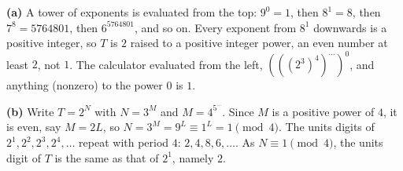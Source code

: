 \textbf{(a)} A tower of exponents is evaluated from the top: $9^0=1$, then $8^1=8$, then $7^8=5764801$, then $6^{5764801}$, and so on. Every exponent from $8^1$ downwards is a positive integer, so $T$ is $2$ raised to a positive integer power, an even number at least $2$, not $1$. The calculator evaluated from the left, $\left(\left(\left(2^3\right)^4\right)^{\cdots}\right)^0$, and anything (nonzero) to the power $0$ is $1$.

\textbf{(b)} Write $T=2^N$ with $N=3^M$ and $M=4^{5^{\cdots}}$. Since $M$ is a positive power of $4$, it is even, say $M=2L$, so $N=3^M=9^L\equiv1^L=1\pmod 4$. The units digits of $2^1,2^2,2^3,2^4,\dots$ repeat with period $4$: $2,4,8,6,\dots$. As $N\equiv1\pmod4$, the units digit of $T$ is the same as that of $2^1$, namely $\boxed{2}$.
